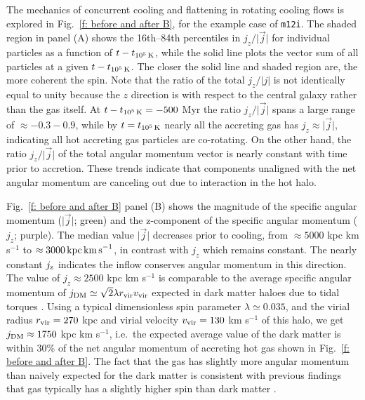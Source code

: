 \documentclass[fleqn,usenatbib]{mnras}
\newcommand{\tcools}{t_{10^5\,{\rm K}}}
\newcommand{\Rvir}{r_{\rm vir}}
\newcommand{\vvir}{v_{\rm vir}}
\begin{document}
The mechanics of concurrent cooling and flattening in rotating cooling flows is explored in Fig.~\ref{f: before and after B}, for the example case of \texttt{m12i}.
The shaded region in panel (A) shows the 16th--84th percentiles in $j_z/\vert\vec j\vert$ for individual particles as a function of $t-\tcools$, while the solid line plots the vector sum of all particles at a given $t-\tcools$.
The closer the solid line and shaded region are, the more coherent the spin.
Note that the ratio of the total $j_z/\vert j \vert$ is not identically equal to unity because the $z$ direction is with respect to the central galaxy rather than the gas itself.
At $t-\tcools=-500$ Myr the ratio $j_z/\vert\vec j\vert$ spans a large range of $\approx -0.3 - 0.9$, while by $t=\tcools$ nearly all the accreting gas has $j_z\approx\vert\vec j\vert$, indicating all hot accreting gas particles are co-rotating.
On the other hand, the ratio $j_z/\vert\vec j\vert$ of the total angular momentum vector is nearly constant with time prior to accretion. 
These trends indicate that components unaligned with the net angular momentum are canceling out due to interaction in the hot halo.

Fig.~\ref{f: before and after B} panel (B) shows the magnitude of the specific angular momentum ($\vert \vec j \vert$; green) and the z-component of the specific angular momentum ($j_z$; purple).
The median value $\vert \vec j \vert$ decreases prior to cooling, from $\approx 5000$ kpc km s$^{-1}$ to $\approx 3000\,{\rm kpc\,km\,s}^{-1}$, in contrast with  $j_z$ which remains constant.
The nearly constant $j_{\rm z}$ indicates the inflow conserves angular momentum in this direction. 
The value of $j_z\approx 2500$ kpc km s$^{-1}$ is comparable to the average specific angular momentum of $j_{\rm DM} \simeq \sqrt{2}\lambda \Rvir \vvir$ expected in dark matter haloes due to tidal torques \citep[e.g.][]{Bullock2001}.
Using a typical dimensionless spin parameter $\lambda \simeq 0.035$, and the virial radius $\Rvir=270$ kpc and virial velocity $\vvir=130$ km s$^{-1}$ of this halo, we get $j_{\rm DM}\approx1750$ kpc km s$^{-1}$, i.e.~the expected average value of the dark matter is within $30\%$ of the net angular momentum of accreting hot gas shown in Fig.~\ref{f: before and after B}.
The fact that the gas has slightly more angular momentum than naively expected for the dark matter is consistent with previous findings that gas typically has a slightly higher spin than dark matter \citep[e.g.][]{Stewart2017}.
\end{document}
